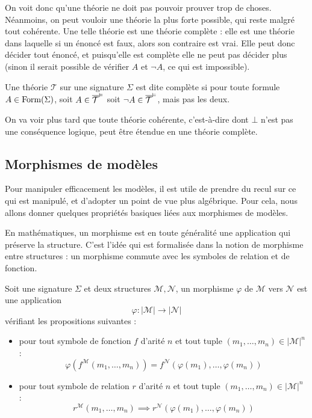 On voit donc qu'une théorie ne doit pas pouvoir prouver trop de choses.
Néanmoins, on peut vouloir une théorie la plus forte possible, qui reste malgré
tout cohérente. Une telle théorie est une théorie complète : elle est une
théorie dans laquelle si un énoncé est faux, alors son contraire est vrai. Elle
peut donc décider tout énoncé, et puisqu'elle est complète elle ne peut pas
décider plus (sinon il serait possible de vérifier $A$ et $\lnot A$, ce qui est
impossible).

\begin{definition}
  Une théorie $\mathcal T$ sur une signature $\Sigma$ est dite complète si pour
  toute formule $A\in\operatorname{Form}(\Sigma)$, soit $A\in \overline{\mathcal T}^{\vDash}$ soit
  $\lnot A \in \overline{\mathcal T}^{\vDash}$, mais pas les deux.
\end{definition}

On va voir plus tard que toute théorie cohérente, c'est-à-dire dont $\bot$ n'est
pas une conséquence logique, peut être étendue en une théorie complète.

\subsection{Morphismes de modèles}

Pour manipuler efficacement les modèles, il est utile de prendre du recul sur ce
qui est manipulé, et d'adopter un point de vue plus algébrique. Pour cela, nous
allons donner quelques propriétés basiques liées aux morphismes de modèles.

En mathématiques, un morphisme est en toute généralité une application qui
préserve la structure. C'est l'idée qui est formalisée dans la notion de
morphisme entre structures : un morphisme commute avec les symboles de relation
et de fonction.

\begin{definition}
  Soit une signature $\Sigma$ et deux structures $\mathcal M,\mathcal N$, un
  morphisme $\varphi$ de $\mathcal M$ vers $\mathcal N$ est une application
  \[\varphi : |\mathcal M|\longrightarrow |\mathcal N|\]
  vérifiant les propositions suivantes :
  \begin{itemize}
  \item pour tout symbole de fonction $f$ d'arité $n$ et tout tuple
    $(m_1,\ldots,m_n)\in|\mathcal M|^n$ :
    \[\varphi(f^{\mathcal M}(m_1,\ldots,m_n))
    = f^{\mathcal N}(\varphi(m_1),\ldots,\varphi(m_n))\]
  \item pour tout symbole de relation $r$ d'arité $n$ et tout tuple
    $(m_1,\ldots,m_n)\in|\mathcal M|^n$ :
    \[r^{\mathcal M}(m_1,\ldots,m_n) \implies
    r^{\mathcal N}(\varphi(m_1),\ldots,\varphi(m_n)) \]
  \end{itemize}
\end{definition}

